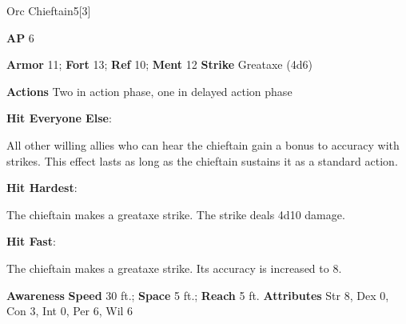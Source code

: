 \begin{monsection}{Orc Chieftain}{5}[3]
\vspace{-1em}\vspace{-1em}
\begin{spellcontent}
\begin{spelltargetinginfo}
{\textbf{AP} 6}

\pari \textbf{Armor} 11;
\textbf{Fort} 13;
\textbf{Ref} 10;
\textbf{Ment} 12
\pari \textbf{Strike} Greataxe  (4d6)


\pari \textbf{Actions} Two in action phase, one in delayed action phase
\end{spelltargetinginfo}


\begin{spelleffects}

\pari
\textbf{Hit Everyone Else}:

All other willing allies who can hear the chieftain gain a  bonus to accuracy with strikes.
This effect lasts as long as the chieftain sustains it as a standard action.




\vspace{0.5em}
\pari
\textbf{Hit Hardest}:

The chieftain makes a greataxe strike.
The strike deals 4d10 damage.




\vspace{0.5em}
\pari
\textbf{Hit Fast}:

The chieftain makes a greataxe strike.
Its accuracy is increased to 8.




\end{spelleffects}

\end{spellcontent}

\begin{monsterfooter}
\pari \textbf{Awareness} 
\pari \textbf{Speed} 30 ft.;
\textbf{Space} 5 ft.;
\textbf{Reach} 5 ft.
\pari \textbf{Attributes}
Str 8,
Dex 0,
Con 3,
Int 0,
Per 6,
Wil 6
\end{monsterfooter}
\end{monsection}



